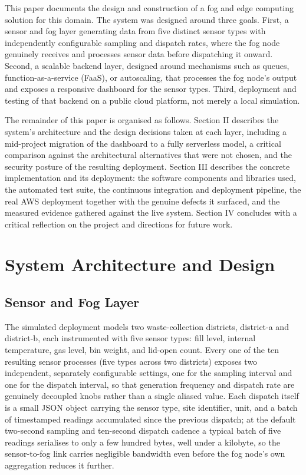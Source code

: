 \documentclass[conference]{IEEEtran}
\begin{document}
This paper documents the design and construction of a fog and edge computing solution for this domain. The system was designed around three goals. First, a sensor and fog layer generating data from five distinct sensor types with independently configurable sampling and dispatch rates, where the fog node genuinely receives and processes sensor data before dispatching it onward. Second, a scalable backend layer, designed around mechanisms such as queues, function-as-a-service (FaaS), or autoscaling, that processes the fog node's output and exposes a responsive dashboard for the sensor types. Third, deployment and testing of that backend on a public cloud platform, not merely a local simulation.

The remainder of this paper is organised as follows. Section II describes the system's architecture and the design decisions taken at each layer, including a mid-project migration of the dashboard to a fully serverless model, a critical comparison against the architectural alternatives that were not chosen, and the security posture of the resulting deployment. Section III describes the concrete implementation and its deployment: the software components and libraries used, the automated test suite, the continuous integration and deployment pipeline, the real AWS deployment together with the genuine defects it surfaced, and the measured evidence gathered against the live system. Section IV concludes with a critical reflection on the project and directions for future work.

\section{System Architecture and Design}

\subsection{Sensor and Fog Layer}
The simulated deployment models two waste-collection districts, district-a and district-b, each instrumented with five sensor types: fill level, internal temperature, gas level, bin weight, and lid-open count. Every one of the ten resulting sensor processes (five types across two districts) exposes two independent, separately configurable settings, one for the sampling interval and one for the dispatch interval, so that generation frequency and dispatch rate are genuinely decoupled knobs rather than a single aliased value. Each dispatch itself is a small JSON object carrying the sensor type, site identifier, unit, and a batch of timestamped readings accumulated since the previous dispatch; at the default two-second sampling and ten-second dispatch cadence a typical batch of five readings serialises to only a few hundred bytes, well under a kilobyte, so the sensor-to-fog link carries negligible bandwidth even before the fog node's own aggregation reduces it further.
\end{document}
